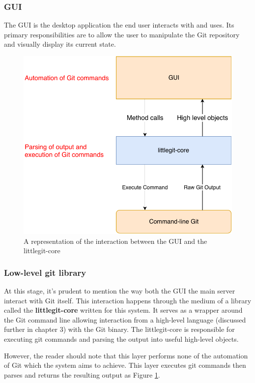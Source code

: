 \subsubsection{GUI}

The GUI is the desktop application the end user interacts with and uses. Its primary responsibilities are to allow the user to manipulate the Git repository and visually display its current state.

\begin{figure} 
    \centering
    \includegraphics[scale = 0.5]{figures/gui-core.pdf}
    \caption{A representation of the interaction between the GUI and the littlegit-core }
    \label{fig:gui-layers}
\end{figure}
\subsubsection{ Low-level git library}

At this stage, it's prudent to mention the way both the GUI the main server interact with Git itself. This interaction happens through the medium of a library called the \textbf{littlegit-core} written for this system. It serves as a wrapper around the Git command line allowing interaction from a high-level language (discussed further in chapter 3) with the Git binary. The littlegit-core is responsible for executing git commands and parsing the output into useful high-level objects.

However, the reader should note that this layer performs none of the automation of Git which the system aims to achieve. This layer executes git commands then parses and returns the resulting output as Figure \ref{fig:gui-layers}.

